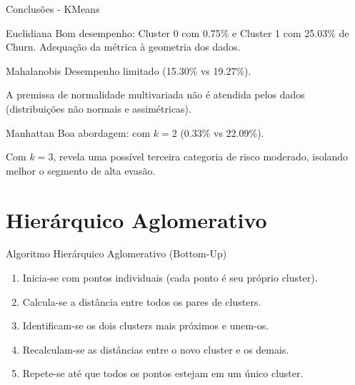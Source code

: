 \documentclass[10pt]{beamer}
\begin{document}
\begin{frame}{Conclusões - KMeans}
    \begin{block}{Euclidiana}
        Bom desempenho: Cluster 0 com 0.75\% e Cluster 1 com 25.03\% de Churn. Adequação da métrica à geometria dos dados.
    \end{block}
    \begin{block}{Mahalanobis}
        Desempenho limitado (15.30\% vs 19.27\%). 

        A premissa de normalidade multivariada não é atendida pelos dados (distribuições não normais e assimétricas).
    \end{block}
    \begin{block}{Manhattan}
        Boa abordagem: com $k=2$ (0.33\% vs 22.09\%). 

        Com $k=3$, revela uma possível terceira categoria de risco moderado, isolando melhor o segmento de alta evasão.
    \end{block}
\end{frame}

\section{Hierárquico Aglomerativo}

\begin{frame}{Algoritmo Hierárquico Aglomerativo (Bottom-Up)}
    \begin{enumerate}
        \item Inicia-se com pontos individuais (cada ponto é seu próprio cluster).
        \item Calcula-se a distância entre todos os pares de clusters.
        \item Identificam-se os dois clusters mais próximos e unem-os.
        \item Recalculam-se as distâncias entre o novo cluster e os demais.
        \item Repete-se até que todos os pontos estejam em um único cluster.
    \end{enumerate}
\end{frame}
\end{document}
